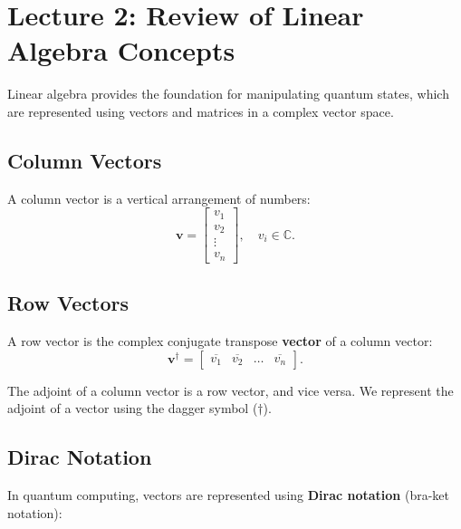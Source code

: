 \section{Lecture 2: Review of Linear Algebra Concepts}\label{sec:lecture2}

Linear algebra provides the foundation for manipulating quantum states, which
are represented using vectors and matrices in a complex vector space.


\subsection*{Column Vectors} 

A column vector is a vertical arrangement of numbers:
\[
  \mathbf{v} =
  \begin{bmatrix}
    v_1 \\
    v_2 \\
    \vdots \\
    v_n
  \end{bmatrix}, \quad v_i \in \mathbb{C}.
\]

\subsection*{Row Vectors}

A row vector is the complex conjugate transpose \textbf{vector}
 of a column vector:
\[
  \mathbf{v}^\dagger =
  \begin{bmatrix}
    \overline{v_1} & \overline{v_2} & \dots & \overline{v_n}
  \end{bmatrix}.
\]

The adjoint of a column vector is a row vector, and vice versa. We represent
the adjoint of a vector using the dagger symbol ($\dagger$).

\subsection*{Dirac Notation }

In quantum computing, vectors are represented using \textbf{Dirac notation}
(bra-ket notation):

